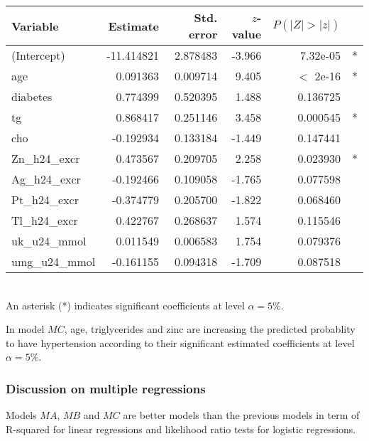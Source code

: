 \begin{table}
\centering
{}
\begin{tabular}{lrrrrl}
\toprule
Variable & Estimate & Std. error & $z$-value & $P(|Z|>|z|)$ &\\
\midrule
(Intercept) &  -11.414821  & 2.878483 & -3.966 & 7.32e-05 &*\\
age      &      0.091363  & 0.009714 &  9.405  & $<$ 2e-16 &*\\
diabetes     &  0.774399  & 0.520395 &  1.488& 0.136725    & \\
tg          &   0.868417  & 0.251146  & 3.458 &0.000545 &*\\
cho       &    -0.192934&   0.133184 & -1.449 &0.147441    & \\
Zn\_h24\_excr   &0.473567 &  0.209705  & 2.258 &0.023930 &*  \\
Ag\_h24\_excr &  -0.192466  &0.109058 & -1.765& 0.077598 & \\
Pt\_h24\_excr   &-0.374779 & 0.205700 & -1.822 &0.068460 &  \\
Tl\_h24\_excr &   0.422767  & 0.268637 &  1.574 &0.115546   &  \\
uk\_u24\_mmol   & 0.011549 &  0.006583&   1.754 &0.079376&  \\
umg\_u24\_mmol  &-0.161155 &  0.094318&  -1.709& 0.087518&  \\
\bottomrule
\end{tabular}
\label{table:betasmc} \\
{\footnotesize An asterisk (*) indicates significant coefficients at level $\alpha=5\%$.}
\end{table}

In model $MC$, age, triglycerides and zinc are increasing the predicted probablity to have hypertension according to their significant estimated coefficients at level $\alpha=5\%$.

\subsubsection{Discussion on multiple regressions}
Models $MA$, $MB$ and $MC$ are better models than the previous models in term of R-squared for linear regressions and likelihood ratio tests for logistic regressions.

